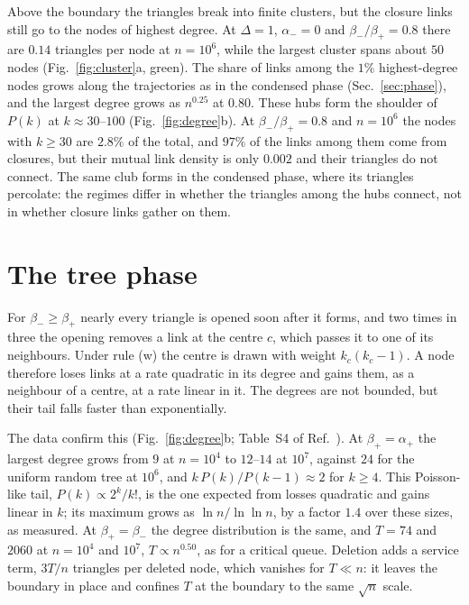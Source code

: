 \documentclass[aps,pre,twocolumn,superscriptaddress,floatfix,nofootinbib]{revtex4-2}
\begin{document}
Above the boundary the triangles break into finite clusters, but the closure
links still go to the nodes of highest degree. At $\Delta=1$, $\alpha_-=0$ and
$\beta_-/\beta_+=0.8$ there are $0.14$ triangles per node at $n=10^6$, while the
largest cluster spans about $50$ nodes (Fig.~\ref{fig:cluster}a, green). The share of links among the $1\%$
highest-degree nodes grows along the trajectories as in the condensed phase
(Sec.~\ref{sec:phase}), and the largest degree grows as $n^{0.25}$ at $0.80$.
These hubs form the shoulder of
$P(k)$ at $k\approx30$--$100$ (Fig.~\ref{fig:degree}b). At $\beta_-/\beta_+=0.8$
and $n=10^6$ the nodes with $k\ge30$ are $2.8\%$ of the total, and $97\%$ of the links among them come from closures,
but their mutual link density is only $0.002$ and their triangles do not
connect. The same club forms in the condensed phase, where its triangles
percolate: the regimes differ in whether the triangles among the hubs connect,
not in whether closure links gather on them.

\section{The tree phase}
\label{sec:tree}

For $\beta_-\ge\beta_+$ nearly every triangle is opened soon after it forms,
and two times in three the opening removes a link at the centre $c$, which
passes it to one of its neighbours. Under rule
(w) the centre is drawn with weight $k_c(k_c-1)$. A node therefore loses links
at a rate quadratic in its degree and gains them, as a neighbour of a centre, at
a rate linear in it. The degrees are not bounded, but their tail falls faster
than exponentially.

The data confirm this (Fig.~\ref{fig:degree}b; Table~S4 of Ref.~\cite{supp}).
At $\beta_+=\alpha_+$ the largest degree grows from $9$ at $n=10^4$ to
$12$--$14$ at $10^7$, against $24$ for the uniform random tree at $10^6$, and
$k\,P(k)/P(k-1)\approx2$ for $k\ge4$. This Poisson-like tail,
$P(k)\propto2^k/k!$, is the one expected from losses quadratic and gains linear
in $k$; its maximum grows as $\ln n/\ln\ln n$, by a factor $1.4$ over these
sizes, as measured. At $\beta_+=\beta_-$ the degree distribution is the same,
and $T=74$ and $2060$ at $n=10^4$ and $10^7$, $T\propto n^{0.50}$, as for a
critical queue. Deletion adds a service term, $3T/n$ triangles per deleted
node, which vanishes for $T\ll n$: it leaves the boundary in place and confines
$T$ at the boundary to the same $\sqrt n$ scale.
\end{document}
